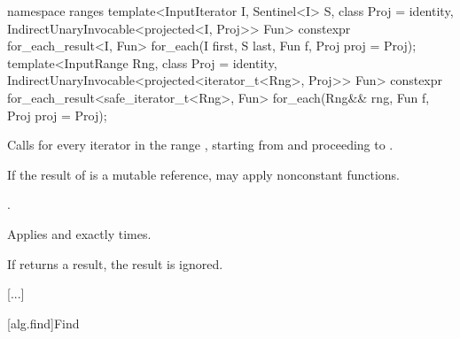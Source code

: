\begin{addedblock}
%
\begin{itemdecl}
namespace ranges {
  template<InputIterator I, Sentinel<I> S, class Proj = identity,
      IndirectUnaryInvocable<projected<I, Proj>> Fun>
    constexpr for_each_result<I, Fun>
      for_each(I first, S last, Fun f, Proj proj = Proj{});
  template<InputRange Rng, class Proj = identity,
      IndirectUnaryInvocable<projected<iterator_t<Rng>, Proj>> Fun>
    constexpr for_each_result<safe_iterator_t<Rng>, Fun>
      for_each(Rng&& rng, Fun f, Proj proj = Proj{});
}
\end{itemdecl}

\begin{itemdescr}
\pnum
\effects
Calls
 for every iterator
 in the range
,
starting from
and proceeding to
.
\begin{note}
If the result of
 is a mutable reference,  may apply
nonconstant functions.
\end{note}

\pnum
\returns
{}.

\pnum
\complexity
Applies  and 
exactly
times.

\pnum
\remarks
If  returns a result, the result is ignored.
\end{itemdescr}
\end{addedblock}

[...]

[alg.find]{Find}

